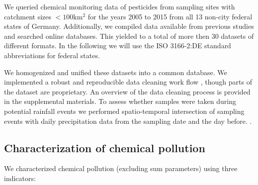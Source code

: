 \documentclass[journal=esthag,manuscript=article]{achemso}
\begin{document}
We queried chemical monitoring data of pesticides from sampling sites with catchment sizes $\mathrm{< 100km^2}$ for the years 2005 to 2015 from all 13 non-city federal states of Germany.
Additionally, we compiled data available from previous studies and searched online databases.
This yielded to a total of more then 30 datasets of different formats.
In the following we will use the ISO 3166-2:DE standard abbreviations for federal states.

We homogenized and unified these datasets into a common database.
We implemented a robust and reproducible data cleaning work flow \citep{poisot_best_2015}, though parts of the dataset are proprietary.
An overview of the data cleaning process is provided in the supplemental materials.  
To assess whether samples were taken during potential rainfall events we performed spatio-temporal intersection of sampling events with daily precipitation data from the sampling date and the day before. \citep{rauthe_central_2013}.

\subsection{Characterization of chemical pollution}
We characterized chemical pollution (excluding sum parameters) using three indicators:
\end{document}
